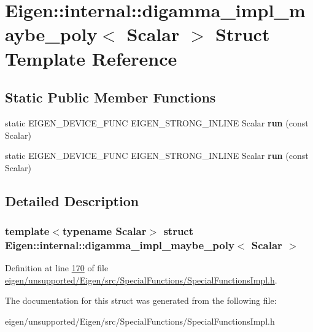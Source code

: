\hypertarget{struct_eigen_1_1internal_1_1digamma__impl__maybe__poly}{}\section{Eigen\+:\+:internal\+:\+:digamma\+\_\+impl\+\_\+maybe\+\_\+poly$<$ Scalar $>$ Struct Template Reference}
\label{struct_eigen_1_1internal_1_1digamma__impl__maybe__poly}
\subsection*{Static Public Member Functions}
\begin{DoxyCompactItemize}
\item 
\mbox{\label{struct_eigen_1_1internal_1_1digamma__impl__maybe__poly_a07dacbfedf3dea7f301706dbd351cfb3}} 
static E\+I\+G\+E\+N\+\_\+\+D\+E\+V\+I\+C\+E\+\_\+\+F\+U\+NC E\+I\+G\+E\+N\+\_\+\+S\+T\+R\+O\+N\+G\+\_\+\+I\+N\+L\+I\+NE Scalar {\bfseries run} (const Scalar)
\item 
\mbox{\label{struct_eigen_1_1internal_1_1digamma__impl__maybe__poly_a07dacbfedf3dea7f301706dbd351cfb3}} 
static E\+I\+G\+E\+N\+\_\+\+D\+E\+V\+I\+C\+E\+\_\+\+F\+U\+NC E\+I\+G\+E\+N\+\_\+\+S\+T\+R\+O\+N\+G\+\_\+\+I\+N\+L\+I\+NE Scalar {\bfseries run} (const Scalar)
\end{DoxyCompactItemize}


\subsection{Detailed Description}
\subsubsection*{template$<$typename Scalar$>$\newline
struct Eigen\+::internal\+::digamma\+\_\+impl\+\_\+maybe\+\_\+poly$<$ Scalar $>$}



Definition at line \hyperlink{eigen_2unsupported_2_eigen_2src_2_special_functions_2_special_functions_impl_8h_source_l00170}{170} of file \hyperlink{eigen_2unsupported_2_eigen_2src_2_special_functions_2_special_functions_impl_8h_source}{eigen/unsupported/\+Eigen/src/\+Special\+Functions/\+Special\+Functions\+Impl.\+h}.



The documentation for this struct was generated from the following file\+:\begin{DoxyCompactItemize}
\item 
eigen/unsupported/\+Eigen/src/\+Special\+Functions/\+Special\+Functions\+Impl.\+h\end{DoxyCompactItemize}
